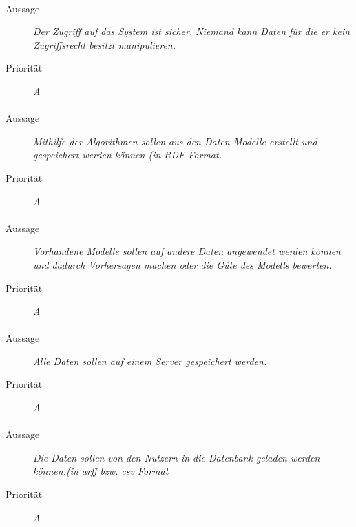 \paragraph{}
\begin{description}
\item[Aussage] \textit{Der Zugriff auf das System ist sicher. Niemand kann Daten für die er kein Zugriffsrecht besitzt manipulieren.}
\item[Priorität] \textit{A}
\end{description}

\paragraph{}
\begin{description}
\item[Aussage] \textit{Mithilfe der Algorithmen sollen aus den Daten Modelle erstellt und gespeichert werden können (in \gls{RDF}-Format.}
\item[Priorität] \textit{A}
\end{description}

\paragraph{}
\begin{description}
\item[Aussage] \textit{Vorhandene Modelle sollen auf andere Daten angewendet werden können und dadurch Vorhersagen machen oder die Güte des Modells bewerten.}
\item[Priorität] \textit{A}
\end{description}

\paragraph{}
\begin{description}
\item[Aussage] \textit{Alle Daten sollen auf einem Server gespeichert werden.}
\item[Priorität] \textit{A}
\end{description}

\paragraph{}
\begin{description}
\item[Aussage] \textit{Die Daten sollen von den Nutzern in die Datenbank geladen werden können.(in \gls{arff} bzw. \gls{csv} Format }
\item[Priorität] \textit{A}
\end{description}


